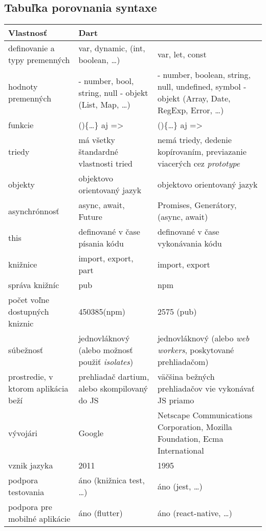 \subsection{Tabuľka porovnania syntaxe}

\begin{tabular}{| p{4cm} | p{5cm} | p{5cm} |}
 \hline         %
   Vlastnosť & Dart & \JS{} \\ %
  \hline
  \hline
   definovanie a typy premenných & 
   var, dynamic,  (int, boolean, \ldots)& %
   var, let, const \\
  \hline
   hodnoty premenných & 
   - number, bool, string, null \newline
   - objekt (List, Map, \ldots)
    & 
   - number, boolean, string, null, undefined, symbol \newline
   - objekt (Array, Date, RegExp, Error, \ldots)
    \\
  \hline
   funkcie & 
   ()\{\ldots\} aj => & 
   ()\{\ldots\} aj => \\
  \hline
   triedy & 
   má všetky štandardné vlastnosti tried & 
   nemá triedy, dedenie kopírovaním, previazanie viacerých cez \emph{prototype} \\
  \hline
   objekty & 
   objektovo orientovaný jazyk & 
   objektovo orientovaný jazyk \\
  \hline
   asynchrónnosť &
   async, await, Future & 
   Promises, Generátory, (async, await) \\
  \hline
   this & 
   definované v čase písania kódu & 
   definované v čase vykonávania kódu \\
  \hline
   knižnice & 
   import, export, part & 
   import, export \\
  \hline
   správa knižníc & 
   pub & 
   npm \\
  \hline
   počet voľne dostupných kniznic & 
   450385\footnotemark (npm) & 
   2575 (pub) \\
  \hline
   súbežnosť & 
   jednovláknový (alebo možnosť použiť \emph{isolates}) & 
   jednovláknový (alebo \emph{web workers}, poskytované prehliadačom) \\
  \hline
   prostredie, v ktorom aplikácia beží & 
   prehliadač dartium, alebo skompilovaný do JS & 
   väčšina bežných prehliadačov vie vykonávať JS priamo \\
  \hline
   vývojári & 
   Google & 
   Netscape Communications Corporation, Mozilla Foundation, Ecma International \\
  \hline
   vznik jazyka & 
   2011 & 
   1995 \\
  \hline
   podpora testovania & 
   áno (knižnica test, \ldots) & 
   áno (jest, \ldots) \\
  \hline
  podpora pre mobilné aplikácie & 
  áno (flutter) & 
  áno (react-native, \ldots) \\
  \hline
 \end{tabular}
